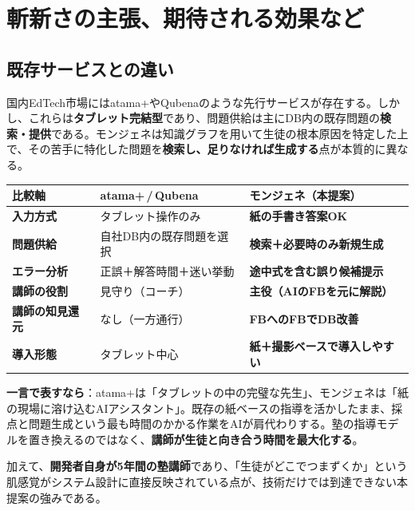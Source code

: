 \documentclass[paper=a4,fontsize=10.5bp,jafontsize=10.5bp,twocolumn]{jlreq}
\begin{document}
\section{斬新さの主張、期待される効果など}

\subsection{既存サービスとの違い}

国内EdTech市場にはatama+やQubenaのような先行サービスが存在する。しかし、これらは\textbf{タブレット完結型}であり、問題供給は主にDB内の既存問題の\textbf{検索・提供}である。モンジェネは知識グラフを用いて生徒の根本原因を特定した上で、その苦手に特化した問題を\textbf{検索し、足りなければ生成する}点が本質的に異なる。

\begin{scriptsize}\noindent
\begin{tabularx}{\linewidth}{>{\bfseries}l X X}
\toprule
比較軸 & atama+\,/\,Qubena & モンジェネ（本提案） \\
\midrule
入力方式 & タブレット操作のみ & \textbf{紙の手書き答案OK} \\
問題供給 & 自社DB内の既存問題を選択 & \textbf{検索＋必要時のみ新規生成} \\
エラー分析 & 正誤＋解答時間＋迷い挙動 & \textbf{途中式を含む誤り候補提示} \\
講師の役割 & 見守り（コーチ） & \textbf{主役（AIのFBを元に解説）} \\
講師の知見還元 & なし（一方通行） & \textbf{FBへのFBでDB改善} \\
導入形態 & タブレット中心 & \textbf{紙＋撮影ベースで導入しやすい} \\
\bottomrule
\end{tabularx}
\end{scriptsize}

\begin{highlightbox}
\textbf{一言で表すなら}：atama+は「タブレットの中の完璧な先生」、モンジェネは「紙の現場に溶け込むAIアシスタント」。既存の紙ベースの指導を活かしたまま、採点と問題生成という最も時間のかかる作業をAIが肩代わりする。塾の指導モデルを置き換えるのではなく、\textbf{講師が生徒と向き合う時間を最大化する}。
\end{highlightbox}

\noindent
加えて、\textbf{開発者自身が5年間の塾講師}であり、「生徒がどこでつまずくか」という肌感覚がシステム設計に直接反映されている点が、技術だけでは到達できない本提案の強みである。
\end{document}
